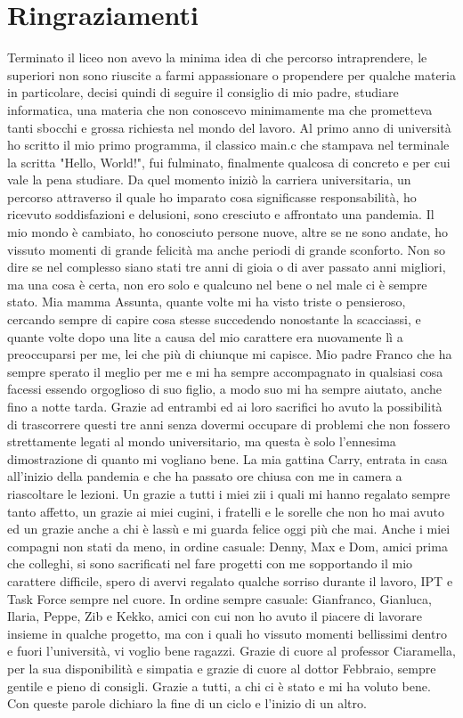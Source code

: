 \chapter*{Ringraziamenti}
Terminato il liceo non avevo la minima idea di che percorso intraprendere, le superiori non sono riuscite a farmi appassionare o propendere per qualche materia in particolare, decisi quindi di seguire il consiglio di mio padre, studiare informatica, una materia che non conoscevo minimamente ma che prometteva tanti sbocchi e grossa richiesta nel mondo del lavoro. Al primo anno di università ho scritto il mio primo programma, il classico main.c che stampava nel terminale la scritta "Hello, World!", fui fulminato, finalmente qualcosa di concreto e per cui vale la pena studiare. Da quel momento iniziò la carriera universitaria, un percorso attraverso il quale ho imparato cosa significasse responsabilità, ho ricevuto soddisfazioni e delusioni, sono cresciuto e affrontato una pandemia. Il mio mondo è cambiato, ho conosciuto persone nuove, altre se ne sono andate, ho vissuto momenti di grande felicità ma anche periodi di grande sconforto. Non so dire se nel complesso siano stati tre anni di gioia o di aver passato anni migliori, ma una cosa è certa, non ero solo e qualcuno nel bene o nel male ci è sempre stato.\newline
Mia mamma Assunta, quante volte mi ha visto triste o pensieroso, cercando sempre di capire cosa stesse succedendo nonostante la scacciassi, e quante volte dopo una lite a causa del mio carattere era nuovamente lì a preoccuparsi per me, lei che più di chiunque mi capisce. Mio padre Franco che ha sempre sperato il meglio per me e mi ha sempre accompagnato in qualsiasi cosa facessi essendo orgoglioso di suo figlio, a modo suo mi ha sempre aiutato, anche fino a notte tarda. Grazie ad entrambi ed ai loro sacrifici ho avuto la possibilità di trascorrere questi tre anni senza dovermi occupare di problemi che non fossero strettamente legati al mondo universitario, ma questa è solo l'ennesima dimostrazione di quanto mi vogliano bene. La mia gattina Carry, entrata in casa all'inizio della pandemia e che ha passato ore chiusa con me in camera a riascoltare le lezioni. Un grazie a tutti i miei zii i quali mi hanno regalato sempre tanto affetto, un grazie ai miei cugini, i fratelli e le sorelle che non ho mai avuto ed un grazie anche a chi è lassù e mi guarda felice oggi più che mai.\newline
Anche i miei compagni non stati da meno, in ordine casuale: Denny, Max e Dom, amici prima che colleghi, si sono sacrificati nel fare progetti con me sopportando il mio carattere difficile, spero di avervi regalato qualche sorriso durante il lavoro, IPT e Task Force sempre nel cuore. In ordine sempre casuale: Gianfranco, Gianluca, Ilaria, Peppe, Zib e Kekko, amici con cui non ho avuto il piacere di lavorare insieme in qualche progetto, ma con i quali ho vissuto momenti bellissimi dentro e fuori l'università, vi voglio bene ragazzi. Grazie  di cuore al professor Ciaramella, per la sua disponibilità e simpatia e grazie di cuore al dottor Febbraio, sempre gentile e pieno di consigli. Grazie a tutti, a chi ci è stato e mi ha voluto bene.\newline
Con queste parole dichiaro la fine di un ciclo e l'inizio di un altro.